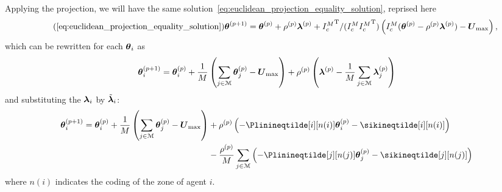\documentclass[../main.tex]{subfiles}
\begin{document}
Applying the projection, we will have the same solution~\eqref{eq:euclidean_projection_equality_solution}, reprised here
\begin{equation}
  \label{eq:euclidean_projection_equality_solution_reprise}
  \tag{\ref*{eq:euclidean_projection_equality_solution}}
  \vec{\theta}\pplusone=\vec{\theta}\p+\rho\p\vec{\lambda}\p+{I_{c}^M}\T/({I_{c}^M} {I_{c}^M}\T)\left({I_{c}^M}(\vec{\theta}\p-\rho\p\vec{\lambda}\p) -\vec{U}_{\max}\right),
\end{equation}
which can be rewritten for each $\boldsymbol{\theta}_i$ as
\begin{equation}
  \boldsymbol{\theta}_i^{(p+1)}= \boldsymbol{\theta}_i^{(p)} + \frac{1}{M}\left(\sum_{j\in\mathcal{M}}\boldsymbol{\theta}_{j}^{(p)}-\boldsymbol{U}_{\max}\right) + \rho^{(p)}\left(\boldsymbol{\lambda}^{(p)}-\frac{1}{M}\sum_{j\in\mathcal{M}}\boldsymbol{\lambda}_j^{(p)}\right)
\end{equation}
and substituting the $\boldsymbol{\lambda}_i$ by $\tilde{\boldsymbol{\lambda}}_{i}$:
\begin{align}
  \vec{\theta}_{i}\pplusone=
  \vec{\theta}_{i}\p+
  \frac{1}{M}\left(\sum_{j\in\set{M}}\vec{\theta}_{j}\p-\vec{U}_{\max}\right)&
                                                                     + \rho\p\left(
                                                                     -\Plinineqtilde[i][n(i)]\thetai\p-\sikineqtilde[i][n(i)]
                                                                     \right) \notag\\
                                                                   &-\frac{\rho\p}{M}\sum_{j\in\set{M}}\left(
                                                                     -\Plinineqtilde[j][n(j)]\vec{\theta}_{j}\p-\sikineqtilde[j][n(j)]
                                                                     \right)
\end{align}
where $n(i)$ indicates the coding of the zone of agent $i$.
\end{document}
